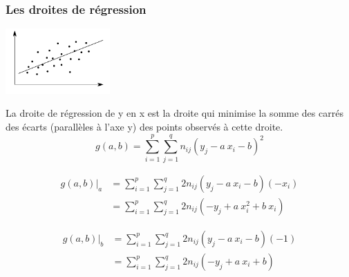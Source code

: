 \subsubsection{Les droites de régression}

\begin{center}
	\includegraphics[width=0.3\textwidth]{images/droite_de_regression.pdf}
\end{center}
La droite de régression de y en x est la droite qui minimise la somme des carrés des écarts (parallèles à l'axe y) des points observés à cette droite.
$$g(a,b) = \sum_{i=1}^{p} \sum_{j=1}^{q} n_{ij} (y_j - a\ x_i - b)^2$$

\begin{align}
g(a,b)|_a &= \sum_{i=1}^{p} \sum_{j=1}^{q} 2n_{ij}(y_j - a\ x_i-b)(-x_i)\\
          &= \sum_{i=1}^{p} \sum_{j=1}^{q} 2n_{ij}(-y_j + a\ x_i^2 + b\ x_i)
\end{align}

\begin{align}
g(a,b)|_b &= \sum_{i=1}^{p} \sum_{j=1}^{q} 2n_{ij}(y_j - a\ x_i-b)(-1)\\
          &= \sum_{i=1}^{p} \sum_{j=1}^{q} 2n_{ij}(-y_j + a\ x_i + b)
\end{align}


